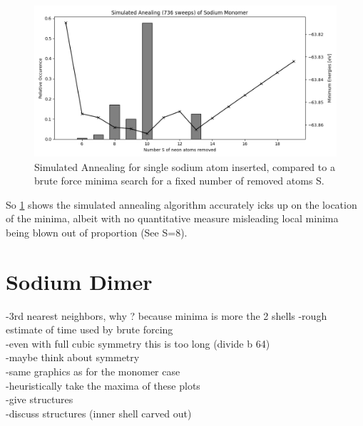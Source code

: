 
\begin{figure}[h!]
	\centering
	\includegraphics[scale=0.5]{./Inhalt/Bilder/optimal_defect_simulated_annealing.png}
	\caption{Simulated Annealing for single sodium atom inserted, compared to a brute force minima search for a fixed number of removed atoms S.}
	\label{fig:simulatedannealingsodium}
\end{figure}  

So \ref{fig:simulatedannealingsodium} shows the simulated annealing algorithm accurately icks up on the location of the minima, albeit with no quantitative measure misleading local minima being blown out of proportion (See S=8).

\section{Sodium Dimer}
-3rd nearest neighbors, why ? because minima is more the 2 shells
-rough estimate of time used by brute forcing\\
-even with full cubic symmetry this is too long (divide b 64)\\
-maybe think about symmetry\\
-same graphics as for the monomer case\\
-heuristically take the maxima of these plots \\
-give structures\\
-discuss structures (inner shell carved out)\\

